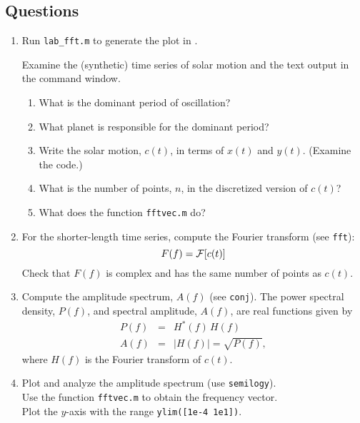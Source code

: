 \documentclass[11pt,titlepage,fleqn]{article}
\begin{document}
\begin{spacing}{2.0}

\section*{Questions}

\begin{enumerate}

\item Run \verb+lab_fft.m+ to generate the plot in .

Examine the (synthetic) time series of solar motion and the text output in the command window.
%
\begin{enumerate}
\item What is the dominant period of oscillation?
\item What planet is responsible for the dominant period?
\item Write the solar motion, $c(t)$, in terms of $x(t)$ and $y(t)$. (Examine the code.)
\item What is the number of points, $n$, in the discretized version of $c(t)$? 
\item What does the function \verb+fftvec.m+ do?
\end{enumerate}


\item For the shorter-length time series, compute the Fourier transform (see \verb+fft+):
%
\begin{equation*}
F(f) = \mbox{$\cal F$}[c(t)]
\end{equation*}
%
Check that $F(f)$ is complex and has the same number of points as $c(t)$.


\item  Compute the amplitude spectrum, $A(f)$ (see \verb+conj+).
The power spectral density, $P(f)$, and spectral amplitude, $A(f)$, are real functions given by
%
\begin{eqnarray*}
P(f) &=& H^{*}(f)\,H(f)
\\
A(f) &=& |H(f)| = \sqrt{P(f)},
\end{eqnarray*}
%
where $H(f)$ is the Fourier transform of $c(t)$.


\item Plot and analyze the amplitude spectrum (use \verb+semilogy+). \\
Use the function \verb+fftvec.m+ to obtain the frequency vector. \\
Plot the $y$-axis with the range \verb+ylim([1e-4 1e1])+.


\end{enumerate}
\end{spacing}
\end{document}
